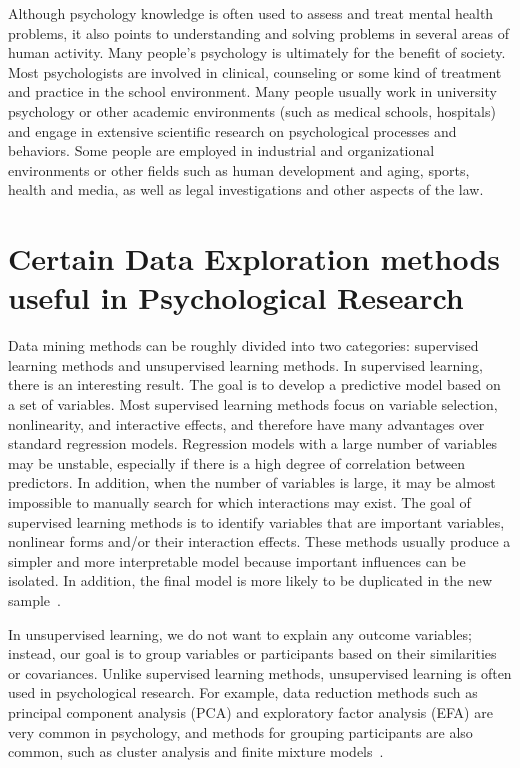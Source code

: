 Although psychology knowledge is often used to assess and treat 
mental health problems, it also points to understanding and solving 
problems in several areas of human activity. Many people's psychology
 is ultimately for the benefit of society. Most psychologists are 
involved in clinical, counseling or some kind of treatment and 
practice in the school environment. Many people usually work in 
university psychology or other academic environments (such as medical
 schools, hospitals) and engage in extensive scientific research on 
psychological processes and behaviors. Some people are employed in 
industrial and organizational environments or other fields such as 
human development and aging, sports, health and media, as well as 
legal investigations and other aspects of the law.


\section{Certain Data Exploration methods useful in Psychological Research}

Data mining methods can be roughly divided into two categories: 
supervised learning methods and unsupervised learning methods. In 
supervised learning, there is an interesting result. The goal is to
 develop a predictive model based on a set of variables. Most 
supervised learning methods focus on variable selection, 
nonlinearity, and interactive effects, and therefore have many 
advantages over standard regression models. Regression models with
 a large number of variables may be unstable, especially if there 
is a high degree of correlation between predictors. In addition, 
when the number of variables is large, it may be almost impossible
 to manually search for which interactions may exist. The goal of 
supervised learning methods is to identify variables that are 
important variables, nonlinear forms and/or their interaction 
effects. These methods usually produce a simpler and more 
interpretable model because important influences can be isolated. 
In addition, the final model is more likely to be duplicated in the
 new sample~\cite{editor11}.

In unsupervised learning, we do not want to explain any outcome 
variables; instead, our goal is to group variables or participants
 based on their similarities or covariances. Unlike supervised 
learning methods, unsupervised learning is often used in 
psychological research. For example, data reduction methods such as
 principal component analysis (PCA) and exploratory factor analysis
 (EFA) are very common in psychology, and methods for grouping 
participants are also common, such as cluster analysis and finite 
mixture models~\cite{editor11}.

